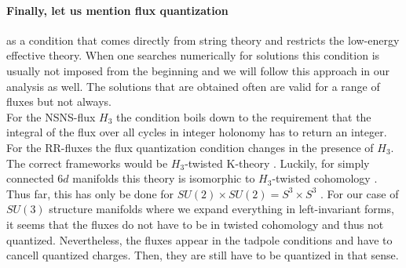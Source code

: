 \documentclass[12pt]{report}
\begin{document}
\paragraph{Finally, let us mention flux quantization} as a condition that comes directly from string theory and restricts the low-energy effective theory. When one searches numerically for solutions this condition is usually not imposed from the beginning and we will follow this approach in our analysis as well. The solutions that are obtained often are valid for a range of fluxes but not always.\\
For the NSNS-flux $H_3$ the condition boils down to the requirement that the integral of the flux over all cycles in integer holonomy has to return an integer. For the RR-fluxes the flux quantization condition changes in the presence of $H_3$. The correct frameworks would be $H_3$-twisted K-theory \cite{Moore:1999gb,Minasian:1997mm}. Luckily, for simply connected $6d$ manifolds this theory is isomorphic to $H_3$-twisted cohomology \cite{Collinucci:2006ug}. Thus far, this has only be done for $SU(2)\times SU(2) = S^ 3 \times S^ 3$ \cite{Danielsson:2011au}.
For our case of $SU(3)$ structure manifolds where we expand everything in left-invariant forms, it seems that the fluxes do not have to be in twisted cohomology and thus not quantized. Nevertheless, the fluxes appear in the tadpole conditions and have to cancell quantized charges. Then, they are still have to be quantized in that sense.
\end{document}
